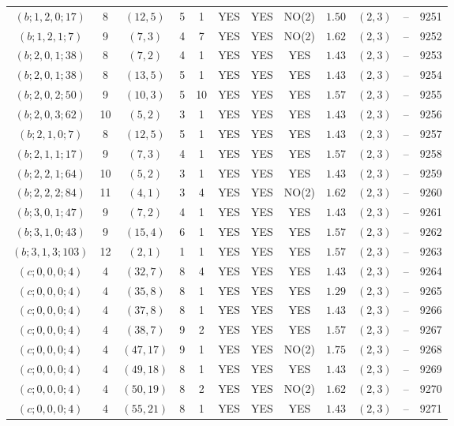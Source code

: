 \begin{longtable}{|c|c|c|c|c|c|c|c|c|c|c|c|}
$(b;1,2,0;17)$ & 8 & $(12,5)$ & 5 & 1 & YES & YES & NO(2) & $1.50$ & $(2,3)$ & -- & 9251\\
$(b;1,2,1;7)$ & 9 & $(7,3)$ & 4 & 7 & YES & YES & NO(2) & $1.62$ & $(2,3)$ & -- & 9252\\
$(b;2,0,1;38)$ & 8 & $(7,2)$ & 4 & 1 & YES & YES & YES & $1.43$ & $(2,3)$ & -- & 9253\\
$(b;2,0,1;38)$ & 8 & $(13,5)$ & 5 & 1 & YES & YES & YES & $1.43$ & $(2,3)$ & -- & 9254\\
$(b;2,0,2;50)$ & 9 & $(10,3)$ & 5 & 10 & YES & YES & YES & $1.57$ & $(2,3)$ & -- & 9255\\
$(b;2,0,3;62)$ & 10 & $(5,2)$ & 3 & 1 & YES & YES & YES & $1.43$ & $(2,3)$ & -- & 9256\\
$(b;2,1,0;7)$ & 8 & $(12,5)$ & 5 & 1 & YES & YES & YES & $1.43$ & $(2,3)$ & -- & 9257\\
$(b;2,1,1;17)$ & 9 & $(7,3)$ & 4 & 1 & YES & YES & YES & $1.57$ & $(2,3)$ & -- & 9258\\
$(b;2,2,1;64)$ & 10 & $(5,2)$ & 3 & 1 & YES & YES & YES & $1.43$ & $(2,3)$ & -- & 9259\\
$(b;2,2,2;84)$ & 11 & $(4,1)$ & 3 & 4 & YES & YES & NO(2) & $1.62$ & $(2,3)$ & -- & 9260\\
$(b;3,0,1;47)$ & 9 & $(7,2)$ & 4 & 1 & YES & YES & YES & $1.43$ & $(2,3)$ & -- & 9261\\
$(b;3,1,0;43)$ & 9 & $(15,4)$ & 6 & 1 & YES & YES & YES & $1.57$ & $(2,3)$ & -- & 9262\\
$(b;3,1,3;103)$ & 12 & $(2,1)$ & 1 & 1 & YES & YES & YES & $1.57$ & $(2,3)$ & -- & 9263\\
$(c;0,0,0;4)$ & 4 & $(32,7)$ & 8 & 4 & YES & YES & YES & $1.43$ & $(2,3)$ & -- & 9264\\
$(c;0,0,0;4)$ & 4 & $(35,8)$ & 8 & 1 & YES & YES & YES & $1.29$ & $(2,3)$ & -- & 9265\\
$(c;0,0,0;4)$ & 4 & $(37,8)$ & 8 & 1 & YES & YES & YES & $1.43$ & $(2,3)$ & -- & 9266\\
$(c;0,0,0;4)$ & 4 & $(38,7)$ & 9 & 2 & YES & YES & YES & $1.57$ & $(2,3)$ & -- & 9267\\
$(c;0,0,0;4)$ & 4 & $(47,17)$ & 9 & 1 & YES & YES & NO(2) & $1.75$ & $(2,3)$ & -- & 9268\\
$(c;0,0,0;4)$ & 4 & $(49,18)$ & 8 & 1 & YES & YES & YES & $1.43$ & $(2,3)$ & -- & 9269\\
$(c;0,0,0;4)$ & 4 & $(50,19)$ & 8 & 2 & YES & YES & NO(2) & $1.62$ & $(2,3)$ & -- & 9270\\
$(c;0,0,0;4)$ & 4 & $(55,21)$ & 8 & 1 & YES & YES & YES & $1.43$ & $(2,3)$ & -- & 9271\\

\end{longtable}
